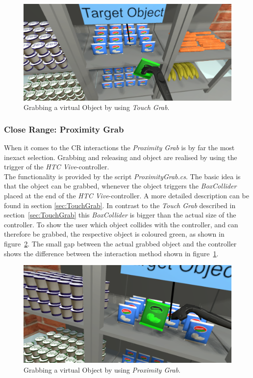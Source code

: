 \begin{figure}[H] 
	\center 
	\includegraphics[width=12cm]{Images/TouchGrab.PNG}			
	\caption[Grabbing a virtual Object by using \textit{Touch Grab}.]{Grabbing a virtual Object by using \textit{Touch Grab}.}
	\label{fig:touchGrab}
\end{figure}

\subsubsection{Close Range: Proximity Grab} \label{sec:ProximityGrab}
When it comes to the CR interactions the \textit{Proximity Grab} is by far the most inexact selection. Grabbing and releasing and object are realised by using the trigger of the \textit{HTC Vive}-controller.  \\
The functionality is provided by the script \textit{ProximityGrab.cs}. The basic idea is that the object can be grabbed, whenever the object triggers the \textit{BoxCollider} \cite{website:BoxCollider} placed at the end of the \textit{HTC Vive}-controller. A more detailed description can be found in section \ref{sec:TouchGrab}. In contrast to the \textit{Touch Grab} described in section~\ref{sec:TouchGrab} this \textit{BoxCollider} is bigger than the actual size of the controller. To show the user which object collides with the controller, and can therefore be grabbed, the respective object is coloured green, as shown in figure~\ref{fig:proximityGrab}. The small gap between the actual grabbed object and the controller shows the difference between the interaction method shown in figure~\ref{fig:touchGrab}.

\begin{figure}[H] 
	\center 
	\includegraphics[width=12cm]{Images/ProximityGrab.PNG}			
	\caption[Grabbing a virtual Object by using \textit{Proximity Grab}.]{Grabbing a virtual Object by using \textit{Proximity Grab}.}
	\label{fig:proximityGrab}
\end{figure}



